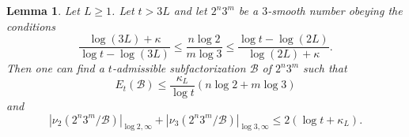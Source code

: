 \documentclass[12pt,a4paper,reqno]{amsart}
\numberwithin{equation}{section}
\theoremstyle{plain}
\newtheorem{lemma}[theorem]{Lemma}
\theoremstyle{definition}
\newcommand\tuple{{\mathcal B}}
\begin{document}
\begin{lemma}\label{bound23}  Let $L \geq 1$.  Let $t > 3L$ and let $2^n 3^m$ be a $3$-smooth number obeying the conditions
\begin{equation}\label{B-bound}
\frac{\log(3L)+\kappa}{\log t - \log(3L)} \leq \frac{n \log 2}{m \log 3} \leq \frac{\log t - \log(2L)}{\log(2L)+\kappa}.
\end{equation}
Then one can find a $t$-admissible subfactorization $\tuple$ of $2^n 3^m$ such that
\begin{equation}\label{excess-bound} 
  E_t(\tuple) \leq \frac{\kappa_L}{\log t} (n \log 2 + m \log 3)
\end{equation}
and
\begin{equation}\label{surplus-bound} 
  |\nu_2(2^n 3^m/\tuple)|_{\log 2,\infty} + |\nu_3(2^n 3^m/\tuple)|_{\log 3,\infty}  \leq 2(\log t + \kappa_L).
\end{equation}
\end{lemma}
\end{document}
